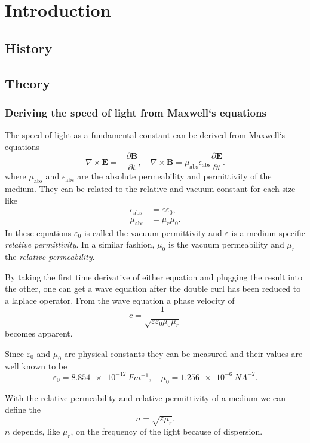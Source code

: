 \section{Introduction}
\label{sec:introduction}

\subsection{History}
\label{sec:history}

\subsection{Theory}
\label{sec:theory}

\subsubsection{Deriving the speed of light from Maxwell`s equations}
The speed of light as a fundamental constant can be derived from Maxwell`s equations
\cite{LabInstructions}
\begin{equation}
  \nabla \times \mathbf{E} = - \frac{\partial \mathbf{B}}{\partial t}, \quad
  \nabla \times \mathbf{B} = \mu_\text{abs} \epsilon_\text{abs} 
                              \frac{\partial \mathbf E}{\partial t} .
\end{equation}
where $\mu_\text{abs}$ and $\epsilon_\text{abs}$ are the absolute permeability and permittivity of
the medium. They can be related to the relative and vacuum constant for each size like
\begin{align}
  \epsilon_\text{abs} &= \varepsilon \varepsilon_0, \\
  \mu_\text{abs} &= \mu_r \mu_0.
\end{align}
In these equations $\varepsilon_0$ is called the vacuum permittivity and $\varepsilon$ is a
medium-specific \textit{relative permittivity}. In a similar fashion, $\mu_0$ is the vacuum
permeability and $\mu_r$ the \textit{relative permeability}.

By taking the first time derivative of either equation and plugging the result into the other, one
can get a wave equation after the double curl has been reduced to a laplace operator. From the wave
equation a phase velocity of
\begin{equation}
  c = \frac{1}{\sqrt{\varepsilon \varepsilon_0 \mu_0 \mu_r}}
\end{equation}
becomes apparent.

Since $\varepsilon_0$ and $\mu_0$ are physical constants they can be measured and their values are
well known to be \cite{muzero,epsilonzero}
\begin{equation}
  \varepsilon_0 = \SI{8.854e-12}{Fm^{-1}}, \quad
  \mu_0 = \SI{1.256e-6}{NA^{-2}}.
\end{equation}

With the relative permeability and relative permittivity of a medium we can define the
\[
  n = \sqrt{\varepsilon \mu_r}.
\]
$n$ depends, like $\mu_r$, on the frequency of the light because of dispersion.


